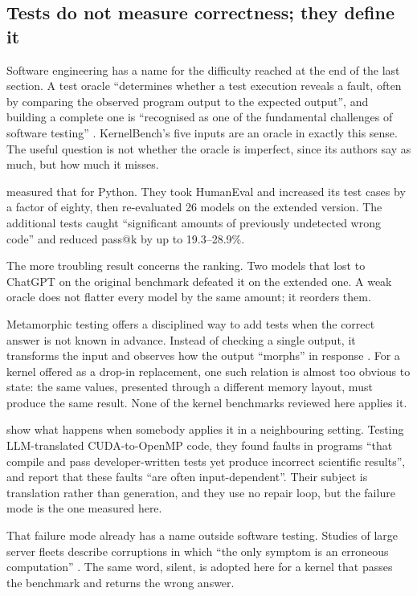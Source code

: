 \documentclass[12pt]{article}
\begin{document}
\subsection{Tests do not measure correctness; they define it}
\label{sec:oracle}

Software engineering has a name for the difficulty reached at the end of the
last section. A test oracle ``determines whether a test execution reveals a
fault, often by comparing the observed program output to the expected
output'', and building a complete one is ``recognised as one of the fundamental
challenges of software testing'' \citep{segura2016metamorphic}. KernelBench's
five inputs are an oracle in exactly this sense. The useful question is not
whether the oracle is imperfect, since its authors say as much, but how much it
misses.

\citet{liu2023evalplus} measured that for Python. They took HumanEval and
increased its test cases by a factor of eighty, then re-evaluated 26 models on
the extended version. The additional tests caught ``significant amounts of
previously undetected wrong code'' and reduced pass@k by up to 19.3--28.9\%.

The more troubling result concerns the ranking. Two models that lost to ChatGPT
on the original benchmark defeated it on the extended one. A weak oracle does
not flatter every model by the same amount; it reorders them.

Metamorphic testing offers a disciplined way to add tests when the correct
answer is not known in advance. Instead of checking a single output, it
transforms the input and observes how the output ``morphs'' in response
\citep{segura2016metamorphic}. For a kernel offered as a drop-in replacement,
one such relation is almost too obvious to state: the same values, presented
through a different memory layout, must produce the same result. None of the
kernel benchmarks reviewed here applies it.

\citet{ludwig2026kaizen} show what happens when somebody applies it in a
neighbouring setting. Testing LLM-translated CUDA-to-OpenMP code, they found
faults in programs ``that compile and pass developer-written tests yet produce
incorrect scientific results'', and report that these faults ``are often
input-dependent''. Their subject is translation rather than generation, and
they use no repair loop, but the failure mode is the one measured here.

That failure mode already has a name outside software testing. Studies of large
server fleets describe corruptions in which ``the only symptom is an erroneous
computation'' \citep{hochschild2021cores}. The same word, silent, is adopted
here for a kernel that passes the benchmark and returns the wrong answer.
\end{document}
